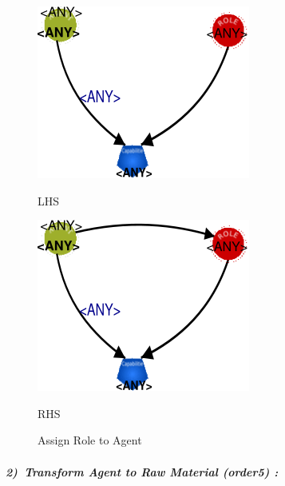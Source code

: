 \vspace{1cm}
\begin{figure}[th]
\centering
\begin{minipage}{.6\textwidth}
   \includegraphics[width=.7\linewidth]{Chapiter3/img/L1}
	\linebreak
	
	\hspace{2.5cm}  LHS
\end{minipage}%
\begin{minipage}{.6\textwidth}
  \includegraphics[width=.7\linewidth]{Chapiter3/img/R1}
  \linebreak  
  
  \hspace{2.5cm}  RHS 
\end{minipage}
\caption{\label{fig:Create link between Agent and Role}Assign Role to Agent } 
\end{figure}
 

\paragraph{\emph{2)~Transform Agent to Raw Material (order5) :} }
 
